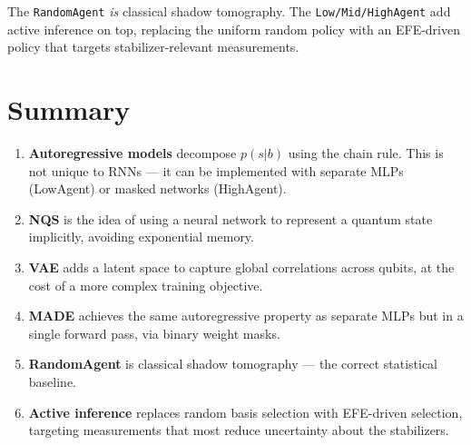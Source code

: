 \documentclass[11pt, a4paper]{article}
\begin{document}
The \texttt{RandomAgent} \emph{is} classical shadow tomography. The
\texttt{Low/Mid/HighAgent} add active inference on top, replacing the
uniform random policy with an EFE-driven policy that targets
stabilizer-relevant measurements.

\section{Summary}

\begin{enumerate}
  \item \textbf{Autoregressive models} decompose $p(s|b)$ using the chain
        rule. This is not unique to RNNs — it can be implemented with
        separate MLPs (LowAgent) or masked networks (HighAgent).
  \item \textbf{NQS} is the idea of using a neural network to represent a
        quantum state implicitly, avoiding exponential memory.
  \item \textbf{VAE} adds a latent space to capture global correlations
        across qubits, at the cost of a more complex training objective.
  \item \textbf{MADE} achieves the same autoregressive property as separate
        MLPs but in a single forward pass, via binary weight masks.
  \item \textbf{RandomAgent} is classical shadow tomography — the correct
        statistical baseline.
  \item \textbf{Active inference} replaces random basis selection with
        EFE-driven selection, targeting measurements that most reduce
        uncertainty about the stabilizers.
\end{enumerate}
\end{document}
